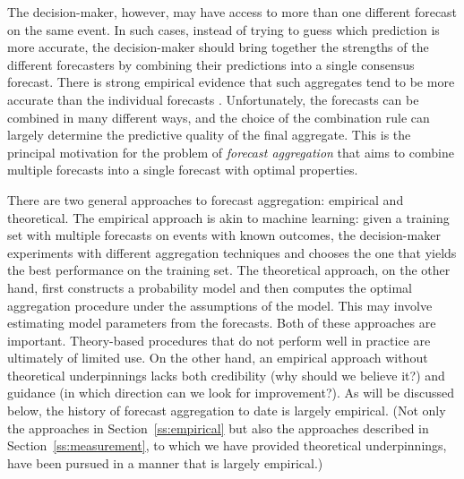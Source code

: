 \documentclass[12pt]{article}
\theoremstyle{definition}
\theoremstyle{definition}
\begin{document}
The decision-maker, however, may have access to more than one different forecast on the same event. In such cases, instead of trying to guess which prediction is more accurate, the decision-maker should bring together the strengths of the different forecasters by combining their predictions into a single consensus forecast. There is strong empirical evidence that such aggregates tend to be more accurate than the individual forecasts \citep{armstrong2}. Unfortunately, the forecasts can be combined in many different ways, and the choice of the combination
rule can largely determine the predictive quality of the final
aggregate.  
This is the principal motivation for the problem of  \textit{forecast aggregation} that aims to combine multiple forecasts into a single
forecast with optimal properties.

There are two general approaches to forecast aggregation: empirical
and theoretical.  The empirical approach is akin to machine
learning: given a training set with multiple forecasts on events with
known outcomes, the decision-maker experiments with different
aggregation techniques and chooses the one that yields the best performance on the training set.
The theoretical approach, on the other hand, first constructs a
probability model and then computes the optimal aggregation procedure
under the assumptions of the model.  This may involve estimating model
parameters from the forecasts. Both of these approaches are important.  Theory-based procedures that do not
perform well in practice are ultimately of limited use.  On the other
hand, an empirical approach without theoretical underpinnings lacks
both credibility (why should we believe it?)  and guidance (in which
direction can we look for improvement?). As will be discussed below, the history of forecast aggregation to date is largely
empirical. (Not only the approaches in
Section~\ref{ss:empirical} but also the approaches described in
Section~\ref{ss:measurement}, to which we have provided theoretical
underpinnings, have been pursued in a manner that is largely
empirical.)
\end{document}
